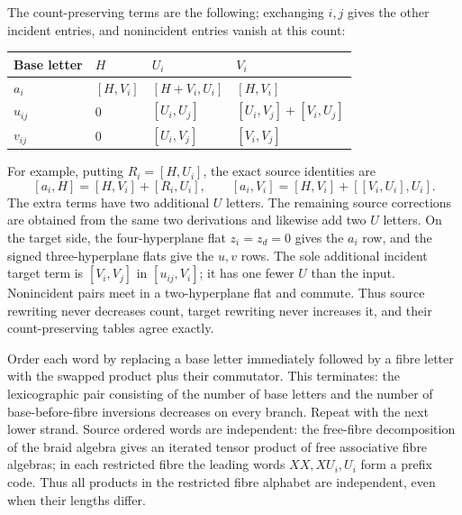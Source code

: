 \documentclass[10pt,a4paper]{article}
\begin{document}
The count-preserving terms are the following; exchanging \(i,j\) gives the other incident entries, and nonincident entries vanish at this count:

\begin{longtable}[]{@{}llll@{}}
\toprule\noalign{}
Base letter & \(H\) & \(U_i\) & \(V_i\) \\
\midrule\noalign{}
\endhead
\bottomrule\noalign{}
\endlastfoot
\(a_i\) & \([H,V_i]\) & \([H+V_i,U_i]\) & \([H,V_i]\) \\
\(u_{ij}\) & \(0\) & \([U_i,U_j]\) & \([U_i,V_j]+[V_i,U_j]\) \\
\(v_{ij}\) & \(0\) & \([U_i,V_j]\) & \([V_i,V_j]\) \\
\end{longtable}

For example, putting \(R_i=[H,U_i]\), the exact source identities are \[
[a_i,H]=[H,V_i]+[R_i,U_i],\qquad
[a_i,V_i]=[H,V_i]+[[V_i,U_i],U_i].
\] The extra terms have two additional \(U\) letters. The remaining source corrections are obtained from the same two derivations and likewise add two \(U\) letters. On the target side, the four-hyperplane flat \(z_i=z_d=0\) gives the \(a_i\) row, and the signed three-hyperplane flats give the \(u,v\) rows. The sole additional incident target term is \([V_i,V_j]\) in \([u_{ij},V_i]\); it has one fewer \(U\) than the input. Nonincident pairs meet in a two-hyperplane flat and commute. Thus source rewriting never decreases count, target rewriting never increases it, and their count-preserving tables agree exactly.

Order each word by replacing a base letter immediately followed by a fibre letter with the swapped product plus their commutator. This terminates: the lexicographic pair consisting of the number of base letters and the number of base-before-fibre inversions decreases on every branch. Repeat with the next lower strand. Source ordered words are independent: the free-fibre decomposition of the braid algebra gives an iterated tensor product of free associative fibre algebras; in each restricted fibre the leading words \(XX,XU_i,U_i\) form a prefix code. Thus all products in the restricted fibre alphabet are independent, even when their lengths differ.
\end{document}
